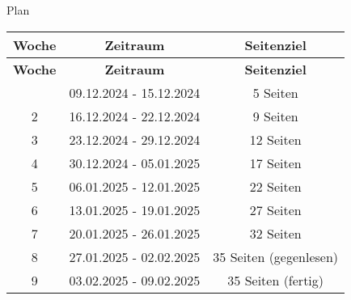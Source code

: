 
\newpage
Plan
\begin{longtable}{|c|c|c|}
\hline
\textbf{Woche} & \textbf{Zeitraum} & \textbf{Seitenziel} \\
\hline
\endfirsthead
\hline
\textbf{Woche} & \textbf{Zeitraum} & \textbf{Seitenziel} \\
\hline
\endhead
\hline
\endfoot
\hline
1 & 09.12.2024 - 15.12.2024 & 5 Seiten \\
2 & 16.12.2024 - 22.12.2024 & 9 Seiten \\
3 & 23.12.2024 - 29.12.2024 & 12 Seiten \\
4 & 30.12.2024 - 05.01.2025 & 17 Seiten \\
5 & 06.01.2025 - 12.01.2025 & 22 Seiten \\
6 & 13.01.2025 - 19.01.2025 & 27 Seiten \\
7 & 20.01.2025 - 26.01.2025 & 32 Seiten \\
8 & 27.01.2025 - 02.02.2025 & 35 Seiten (gegenlesen) \\
9 & 03.02.2025 - 09.02.2025 & 35 Seiten (fertig) \\
\hline
\end{longtable}